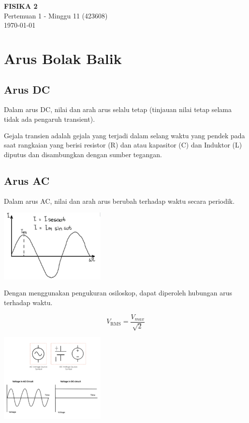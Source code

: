 \documentclass[twocolumn, 11pt]{article}%
\begin{document}
\begin{strip}
  \vspace*{\dimexpr-\stripsep}
  \begin{center}
      \Large\textbf{FISIKA 2}\\
      \large{Pertemuan 1 - Minggu 11 (423608)}\\
      \large{\today}
   \end{center}
\end{strip}

\section{Arus Bolak Balik}

\subsection{Arus DC}%
Dalam arus DC, nilai dan arah arus selalu tetap (tinjauan nilai tetap
selama tidak ada pengaruh transient).

Gejala transien adalah gejala yang terjadi dalam selang waktu yang pendek
pada saat rangkaian yang berisi resistor (R) dan atau kapasitor (C) dan
Induktor (L) diputus dan disambungkan dengan sumber tegangan.

\subsection{Arus AC}%
Dalam arus AC, nilai dan arah arus berubah terhadap waktu secara
periodik.

\begin{center}
    \includegraphics[width=200px]{1.png}
\end{center}

Dengan menggunakan pengukuran osiloskop, dapat diperoleh hubungan arus
terhadap waktu.

\[ V_{\text{RMS}} = \frac{V_{max}}{\sqrt2} \]

\begin{center}
    \includegraphics[width=200px]{2.png}
\end{center}
\end{document}
